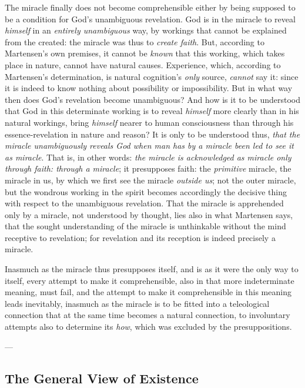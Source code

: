 \documentclass[12pt,a4paper]{book}
\begin{document}
The miracle finally does not become comprehensible either by being supposed to be a condition for
God's unambiguous revelation. God is in the miracle to reveal \emph{himself} in an \emph{entirely unambiguous} way,
by workings that cannot be explained from the created: the miracle was thus to \emph{create faith}.
But, according to Martensen's own premises, it cannot be \emph{known} that this working, which takes place
in nature, cannot have natural causes. Experience, which, according to Martensen's determination, is
natural cognition's \emph{only} source, \emph{cannot} say it: since it is indeed to know nothing about
possibility or impossibility. But in what way then does God's revelation become unambiguous? And how
is it to be understood that God in this determinate working is to reveal \emph{himself} more clearly than in
his natural workings, bring \emph{himself} nearer to human consciousness than through his
essence-revelation in nature and reason? It is only to be understood thus, \emph{that the miracle
unambiguously reveals God when man has by a miracle been led to see it as miracle}. That is, in other
words: \emph{the miracle is acknowledged as miracle only through faith: through a miracle}; it
presupposes faith: the \emph{primitive} miracle, the miracle in us, by which we first see the miracle
\emph{outside us}; not the outer miracle, but the wondrous working in the spirit becomes accordingly the
decisive thing with respect to the unambiguous revelation. That the miracle is apprehended only by a
miracle, not understood by thought, lies also in what Martensen says, that the sought understanding
of the miracle is unthinkable without the mind receptive to revelation; for revelation and its
reception is indeed precisely a miracle.

Inasmuch as the miracle thus presupposes itself, and is as it were the only way to itself, every
attempt to make it comprehensible, also in that more indeterminate meaning, must fail, and the
attempt to make it comprehensible in this meaning leads inevitably, inasmuch as the miracle is to be
fitted into a teleological connection that at the same time becomes a natural connection, to
involuntary attempts also to determine its \emph{how}, which was excluded by the presuppositions.

\begin{center}---\end{center}

\subsection{The General View of Existence}
\label{ssec:general-view}
\end{document}
